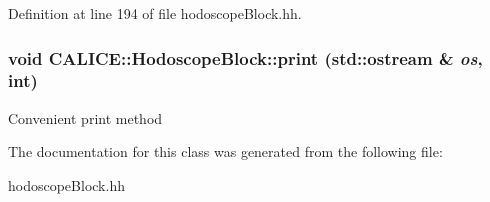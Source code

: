 Definition at line 194 of file hodoscopeBlock.hh.
\subsubsection[{print}]{\setlength{\rightskip}{0pt plus 5cm}void CALICE::HodoscopeBlock::print (std::ostream \& {\em os}, \/  int)}\label{classCALICE_1_1HodoscopeBlock_a88f8139e50bcc17ae72ad96d63b224cc}
Convenient print method 

The documentation for this class was generated from the following file:\begin{DoxyCompactItemize}
\item 
hodoscopeBlock.hh\end{DoxyCompactItemize}
